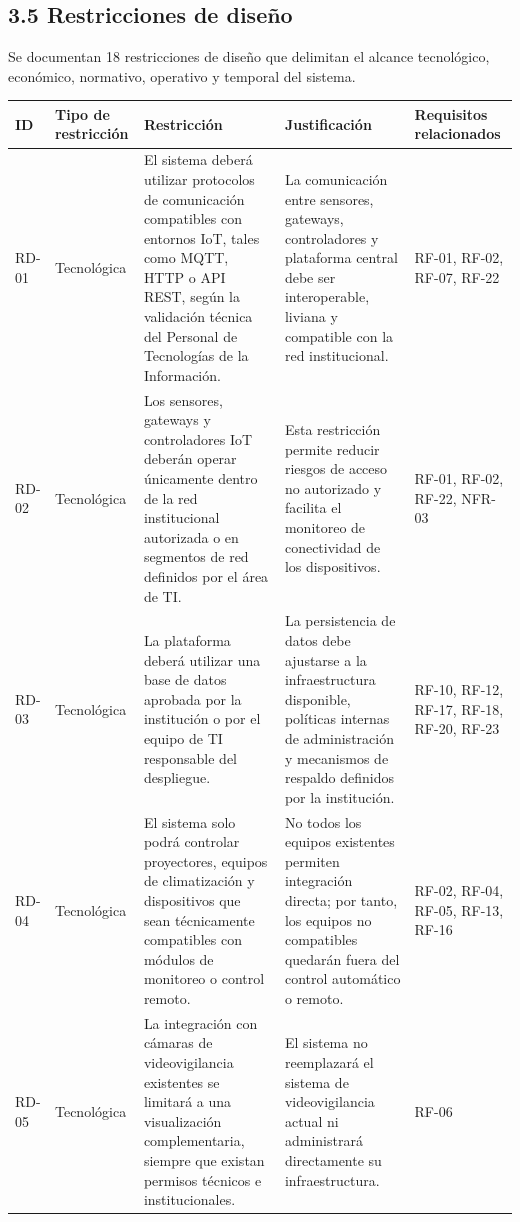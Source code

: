 \subsection*{3.5 Restricciones de diseño}


Se documentan 18 restricciones de diseño que delimitan el alcance tecnológico, económico, normativo, operativo y temporal del sistema.


\begingroup
\small
\begin{longtable}{|p{3.1cm}|p{3.1cm}|p{3.1cm}|p{3.1cm}|p{3.1cm}|}
\hline
ID & Tipo de restricción & Restricción & Justificación & Requisitos relacionados \\ \hline
RD-01 & Tecnológica & El sistema deberá utilizar protocolos de comunicación compatibles con entornos IoT, tales como MQTT, HTTP o API REST, según la validación técnica del Personal de Tecnologías de la Información. & La comunicación entre sensores, gateways, controladores y plataforma central debe ser interoperable, liviana y compatible con la red institucional. & RF-01, RF-02, RF-07, RF-22 \\ \hline
RD-02 & Tecnológica & Los sensores, gateways y controladores IoT deberán operar únicamente dentro de la red institucional autorizada o en segmentos de red definidos por el área de TI. & Esta restricción permite reducir riesgos de acceso no autorizado y facilita el monitoreo de conectividad de los dispositivos. & RF-01, RF-02, RF-22, NFR-03 \\ \hline
RD-03 & Tecnológica & La plataforma deberá utilizar una base de datos aprobada por la institución o por el equipo de TI responsable del despliegue. & La persistencia de datos debe ajustarse a la infraestructura disponible, políticas internas de administración y mecanismos de respaldo definidos por la institución. & RF-10, RF-12, RF-17, RF-18, RF-20, RF-23 \\ \hline
RD-04 & Tecnológica & El sistema solo podrá controlar proyectores, equipos de climatización y dispositivos que sean técnicamente compatibles con módulos de monitoreo o control remoto. & No todos los equipos existentes permiten integración directa; por tanto, los equipos no compatibles quedarán fuera del control automático o remoto. & RF-02, RF-04, RF-05, RF-13, RF-16 \\ \hline
RD-05 & Tecnológica & La integración con cámaras de videovigilancia existentes se limitará a una visualización complementaria, siempre que existan permisos técnicos e institucionales. & El sistema no reemplazará el sistema de videovigilancia actual ni administrará directamente su infraestructura. & RF-06 \\ \hline

\end{longtable}
